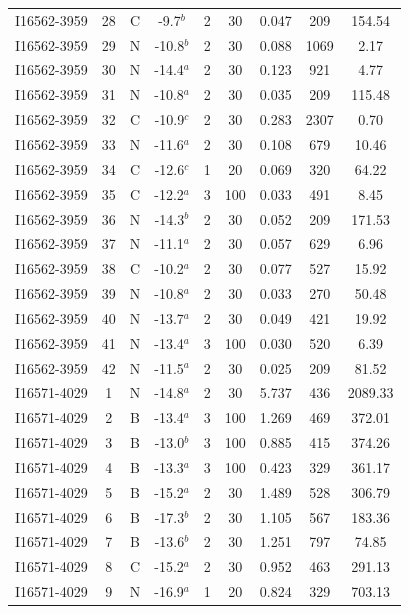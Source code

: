 \begin{table}
\begin{tabular}{ccccccccc}
I16562-3959 & 28 & C & -9.7$^{b}$ & 2 & 30 & 0.047 & 209 & 154.54 \\
I16562-3959 & 29 & N & -10.8$^{b}$ & 2 & 30 & 0.088 & 1069 & 2.17 \\
I16562-3959 & 30 & N & -14.4$^{a}$ & 2 & 30 & 0.123 & 921 & 4.77 \\
I16562-3959 & 31 & N & -10.8$^{a}$ & 2 & 30 & 0.035 & 209 & 115.48 \\
I16562-3959 & 32 & C & -10.9$^{c}$ & 2 & 30 & 0.283 & 2307 & 0.70 \\
I16562-3959 & 33 & N & -11.6$^{a}$ & 2 & 30 & 0.108 & 679 & 10.46 \\
I16562-3959 & 34 & C & -12.6$^{c}$ & 1 & 20 & 0.069 & 320 & 64.22 \\
I16562-3959 & 35 & C & -12.2$^{a}$ & 3 & 100 & 0.033 & 491 & 8.45 \\
I16562-3959 & 36 & N & -14.3$^{b}$ & 2 & 30 & 0.052 & 209 & 171.53 \\
I16562-3959 & 37 & N & -11.1$^{a}$ & 2 & 30 & 0.057 & 629 & 6.96 \\
I16562-3959 & 38 & C & -10.2$^{a}$ & 2 & 30 & 0.077 & 527 & 15.92 \\
I16562-3959 & 39 & N & -10.8$^{a}$ & 2 & 30 & 0.033 & 270 & 50.48 \\
I16562-3959 & 40 & N & -13.7$^{a}$ & 2 & 30 & 0.049 & 421 & 19.92 \\
I16562-3959 & 41 & N & -13.4$^{a}$ & 3 & 100 & 0.030 & 520 & 6.39 \\
I16562-3959 & 42 & N & -11.5$^{a}$ & 2 & 30 & 0.025 & 209 & 81.52 \\
I16571-4029 & 1 & N & -14.8$^{a}$ & 2 & 30 & 5.737 & 436 & 2089.33 \\
I16571-4029 & 2 & B & -13.4$^{a}$ & 3 & 100 & 1.269 & 469 & 372.01 \\
I16571-4029 & 3 & B & -13.0$^{b}$ & 3 & 100 & 0.885 & 415 & 374.26 \\
I16571-4029 & 4 & B & -13.3$^{a}$ & 3 & 100 & 0.423 & 329 & 361.17 \\
I16571-4029 & 5 & B & -15.2$^{a}$ & 2 & 30 & 1.489 & 528 & 306.79 \\
I16571-4029 & 6 & B & -17.3$^{b}$ & 2 & 30 & 1.105 & 567 & 183.36 \\
I16571-4029 & 7 & B & -13.6$^{b}$ & 2 & 30 & 1.251 & 797 & 74.85 \\
I16571-4029 & 8 & C & -15.2$^{a}$ & 2 & 30 & 0.952 & 463 & 291.13 \\
I16571-4029 & 9 & N & -16.9$^{a}$ & 1 & 20 & 0.824 & 329 & 703.13 \\

\end{tabular}
\end{table}
